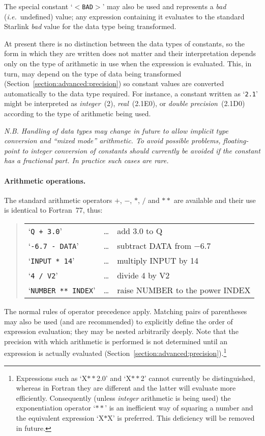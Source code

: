 \documentclass[twoside,11pt]{article}
\renewcommand{\_}{\texttt{\symbol{95}}}
\newcommand{\name}[1]{\mbox{\small{#1}}}
\begin{document}
The special constant `$<$\verb#BAD#$>$' may also be used and represents a
\emph{bad} (\emph{i.e.}\ undefined) value; any expression containing it
evaluates to the standard Starlink \emph{bad} value for the data type being
transformed.

At present there is no distinction between the data types of constants, so
the form in which they are written does not matter and their interpretation
depends only on the type of arithmetic in use when the expression is
evaluated.
This, in turn, may depend on the type of data being transformed
(Section~\ref{section:advanced:precision}) so constant values are converted
automatically to the data type required.
For instance, a constant written as `\mbox{\texttt{2.1}}' might be interpreted as
\emph{integer}~(2), \emph{real}~(2.1E0), or \emph{double precision}~(2.1D0)
according to the type of arithmetic being used.

\emph{N.B. Handling of data types may change in future to allow implicit type
conversion and ``mixed mode'' arithmetic.
To avoid possible problems, floating-point to integer conversion of
constants should currently be avoided if the constant has a fractional part.
In practice such cases are rare.}

\paragraph{Arithmetic operations.}
The standard arithmetic operators $+$, $-$, $*$, $/$ and $**$ are available
and their use is identical to Fortran~77, thus:

\begin{quote}
\begin{center}
\begin{tabular}{lcl}

`\texttt{Q + 3.0}' & \ldots & add 3.0 to Q\\
`\texttt{-6.7 - DATA}' & \dots & subtract \name{DATA} from $-$6.7\\
`\texttt{INPUT * 14}' & \ldots & multiply \name{INPUT} by 14 \\
`\texttt{4 / V2}' & \ldots & divide 4 by \name{V2}\\
`\texttt{NUMBER ** INDEX}' & \ldots & raise \name{NUMBER} to the power
\name{INDEX}

\end{tabular}
\end{center}
\end{quote}

The normal rules of operator precedence apply.
Matching pairs of parentheses may also be used (and are recommended) to
explicitly define the order of expression evaluation; they may be nested
arbitrarily deeply.
Note that the precision with which arithmetic is performed is not determined
until an expression is actually evaluated
(Section~\ref{section:advanced:precision}).\footnote{
Expressions such as `X$**$2.0' and `X$**$2' cannot currently be
distinguished, whereas in Fortran they are different and the latter will
evaluate more efficiently.
Consequently (unless \emph{integer} arithmetic is being used) the
exponentiation operator `$**$' is an inefficient way of squaring a
number and the equivalent expression `X$*$X' is preferred.
This deficiency will be removed in future.}
\end{document}
